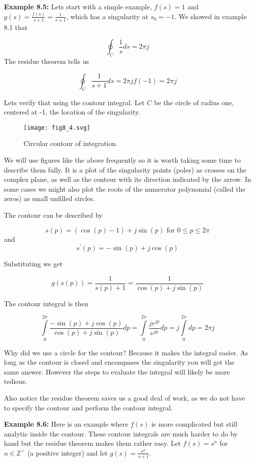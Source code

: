 \documentclass{article}
\begin{document}
\textbf{Example 8.5:} Lets start with a simple example, $f(s) = 1$ and $g(s) = \frac{f(s)}{s+1} = \frac{1}{s+1}$, which has a singularity at $s_0 = -1$. We showed in example 8.1 that

\[
\oint_C \frac{1}{s} ds = 2\pi j 
\]
The residue theorem tells us

\[
\oint_C \frac{1}{s+1} ds = 2\pi j f(-1) = 2\pi j 
\]

Lets verify that using the contour integral. Let $C$ be the circle of radius one, centered at -1, the location of the singularity.

\begin{figure}
  \centering
  \texttt{[image: fig8\_4.svg]}
  \caption{Circular contour of integration.}
\end{figure}

We will use figures like the above frequently so it is worth taking some time to describe them fully. It is a plot of the singularity points (poles) as crosses on the complex plane, as well as the contour with its direction indicated by the arrow. In some cases we might also plot the roots of the numerator polynomial (called the zeros) as small unfilled circles.

The contour can be described by

\[
s(p) = (\cos(p) - 1) + j\sin(p) \text{ for } 0 \leq p \leq 2\pi
\]
and
\[
s^\prime(p) = -\sin(p) + j\cos(p)
\]

Substituting we get

\[
g(s(p)) = \frac{1}{s(p) + 1} = \frac{1}{\cos(p) + j\sin(p)}
\]

The contour integral is then

\[
\int\limits_{0}^{2\pi} \frac{-\sin(p) + j\cos(p)}{\cos(p) + j\sin(p)} dp = \int\limits_{0}^{2\pi} \frac{je^{jp}}{e^{jp}} dp = j \int\limits_{0}^{2\pi} dp = 2\pi j 
\]

Why did we use a circle for the contour? Because it makes the integral easier. As long as the contour is closed and encompases the singularity you will get the same answer. However the steps to evaluate the integral will likely be more tedious.

Also notice the residue theorem saves us a good deal of work, as we do not have to specify the contour and perform the contour integral.

\textbf{Example 8.6:} Here is an example where $f(s)$ is more complicated but still analytic inside the contour. These contour integrals are much harder to do by hand but the residue theorem makes them rather easy. Let $f(s) = s^n$ for $n\in\mathbb{Z}^+$ (a positive integer) and let $g(s) = \frac{s^n}{s+1}$.
\end{document}
